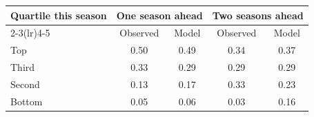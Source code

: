 \begin{tabular}{lcccc}
\toprule
Quartile this season & \multicolumn{2}{c}{One season ahead} & \multicolumn{2}{c}{Two seasons ahead} \\
\cmidrule(lr){2-3}\cmidrule(lr){4-5}
 & Observed & Model & Observed & Model \\
\midrule
Top & 0.50 & 0.49 & 0.34 & 0.37 \\
Third & 0.33 & 0.29 & 0.29 & 0.29 \\
Second & 0.13 & 0.17 & 0.33 & 0.23 \\
Bottom & 0.05 & 0.06 & 0.03 & 0.16 \\
\bottomrule
\end{tabular}
